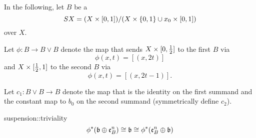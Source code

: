 \begin{myparagraph}
    In the following, let $B$ be a 
    \[ SX = (X \times{} [0, 1]) / (X \times \{0, 1\} \cup x_0 \times{} [0, 1])\]
    over $X$.

    Let $\phi: B \to B \vee B$ denote the map that sends
    $X \times [0, \frac{1}{2}]$ to the first $B$ via
    \[ \phi(x, t) = [(x, 2t)] \]
    and $X \times [\frac{1}{2}, 1]$ to the second $B$ via
    \[ \phi(x, t) = [(x, 2t - 1)]. \]

    Let $c_1: B \vee B \to B$ denote the map that is the identity on the first summand
    and the constant map to $b_0$ on the second summand (symmetrically define $c_2$).
\end{myparagraph}

\begin{mylemma}{suspension::triviality}
    \[ \phi^*(\mathfrak{b} \oplus{} \mathfrak{e}^{n}_B) \cong \mathfrak{b} \cong \phi^*(\mathfrak{e}^{n}_B \oplus{} \mathfrak{b}) \]
\end{mylemma}
